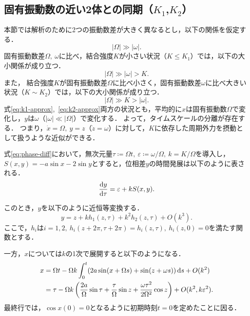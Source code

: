 \documentclass[../main]{subfiles}
\begin{document}
    \subsection{固有振動数の近い2体との同期（$K_1$,$K_2$）}
    \label{sec:3body-k12}
    本節では解析のために2つの振動数差が大きく異なるとし，以下の関係を仮定する．
    \begin{equation}
        \label{eq:assume}
        |\Omega|\gg|\omega|.
    \end{equation}
    固有振動数差$\Omega,\ \omega$に比べ，結合強度$K$が小さい状況（$K\leq K_1$）では，以下の大小関係が成り立つ．
    \begin{equation}
        \label{eq:k1-approx}
        |\Omega|\gg|\omega|>K.
    \end{equation}
    また，
    結合強度$K$が固有振動数差$\Omega$に比べ小さく，固有振動数差$\omega$に比べ大きい状況（$K\sim K_2$）では，以下の大小関係が成り立つ．
    \begin{equation}
        \label{eq:k2-approx}
        |\Omega|\gg K>|\omega|.
    \end{equation}
    式\eqref{eq:k1-approx},\ \eqref{eq:k2-approx}両方の状況とも，平均的に$x$は固有振動数$\Omega$で変化し，$y$は$\omega$（$|\omega|\ll|\Omega|$）で変化する．
    よって，タイムスケールの分離が存在する．
    つまり，$\dot{x}=\Omega,\ y=z$（$\dot{z}=\omega$）に対して，$K$に依存した周期外力を摂動として扱うような近似ができる．

    式\eqref{eq:phase-diff}において，無次元量$\tau\coloneqq\Omega t,\ \varepsilon\coloneqq\omega/\Omega,\ k=K/\Omega$を導入し，$S(x,y)=-a\sin x-2\sin y$とすると，位相差$y$の時間発展は以下のように表される．
    \begin{equation}
        \dv{y}{\tau}=\varepsilon+k S(x,y).
    \end{equation}

    このとき，$y$を以下のように近恒等変換する．
    \begin{equation}
        y=z+kh_1(z,\tau)+k^2h_2(z,\tau)+O(k^3).
        \label{eq:pertu-ytilde}
    \end{equation}
    ここで，$h_i$は$i=1,2,\ h_i(z+2\pi,\tau+2\pi)=h_i(z,\tau),\ h_i(z,0)=0$を満たす関数とする．

    一方，$x$については$k$の1次で展開すると以下のようになる．
    \begin{align}
        x&=\Omega t-\Omega k\int_0^t(2a\sin(x+\Omega s)+\sin (z+\omega s))\dd{s}+O(k^2)\notag\\ 
        &=\tau-\Omega k\left(\frac{2a}{\Omega}\sin\tau+\frac{\tau}{\Omega}\sin z+\frac{\omega \tau^2}{2\Omega^2}\cos z\right)+O(k^2,k\varepsilon^2).\label{eq:x-series}
    \end{align}
    最終行では，$\cos x(0)=0$となるように初期時刻$t=0$を定めたことに因る．
    
\end{document}
